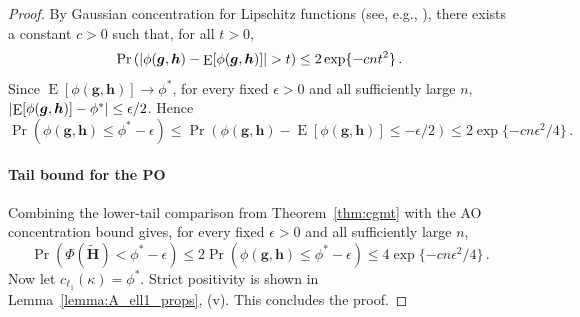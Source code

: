 \documentclass{article}
\makeatletter
\DeclareMathOperator{\expect}{E}
\theoremstyle{definition}
\newcommand{\abs}[1]{%
	\ensuremath{%
		\if@display
		\left| #1 \right|
		\else
		\lvert #1 \rvert
		\fi
	}%
}
\newcommand*{\bb}{\boldsymbol}
\def\bH {\bb{H}}
\def\bh{\bb{h}}
\def\bg{\bb{g}}
\def\bH{\bb{H}}
\makeatother
\begin{document}
\begin{bibunit}
\begin{proof}
	By Gaussian concentration for Lipschitz functions
	(see, e.g., \citealt[][Theorem~5.2.2]{vershynin:2018}), there exists a
	constant $c>0$ such that, for all $t>0$,
	$$
	    \Pr\left(
	    \abs{\phi(\bg,\bh)-\expect[\phi(\bg,\bh)]}>t
	    \right)
	    \leq
	    2\exp\{-cnt^2\} \,. 
	$$
	Since $\expect[\phi(\bg,\bh)]\to\phi^*$, for every fixed $\epsilon>0$ and
	all sufficiently large $n$,
	$\abs{\expect[\phi(\bg,\bh)]-\phi^*}\leq\epsilon/2$. Hence
	$$
		\Pr\left(\phi(\bg,\bh)\leq\phi^*-\epsilon\right) \leq \Pr\left( \phi(\bg,\bh)-\expect[\phi(\bg,\bh)]\leq-\epsilon/2 \right) \leq 2\exp\{-cn\epsilon^2/4\} \,.
	$$

	\paragraph*{Tail bound for the PO}
	Combining the lower-tail comparison from Theorem~\ref{thm:cgmt} with the AO
	concentration bound gives, for every fixed $\epsilon>0$ and all sufficiently
	large $n$,
	$$
		\Pr\left( \Phi(\widetilde{\bH}) < \phi^*-\epsilon \right) \leq 2\Pr\left( \phi(\bg,\bh) \leq \phi^*-\epsilon \right) \leq 4\exp\{-cn\epsilon^2/4\} \,.
	$$
	Now let $c_{\ell_1}(\kappa)=\phi^*$. Strict positivity is shown in
	Lemma~\ref{lemma:A_ell1_props}, (v). This concludes the proof.
\end{proof}


\end{bibunit}
\end{document}
